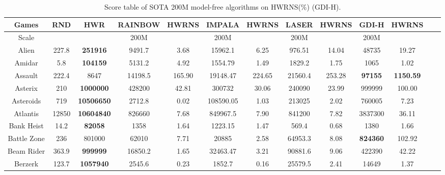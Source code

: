 \documentclass[nohyperref]{article}
\theoremstyle{plain}
\begin{document}
\begin{table}[!hb]
\footnotesize
\begin{center}
\caption{Score table of SOTA 200M model-free algorithms on HWRNS(\%)  (GDI-H). }
\setlength{\tabcolsep}{1.0pt}
\begin{tabular}{|c| c| c| c c| c c| c c| c c| c c|}
\hline
Games               & RND       & HWR       & RAINBOW  & HWRNS & IMPALA  & HWRNS & LASER  & HWRNS  & GDI-H & HWRNS \\
\hline
Scale               &           &           & 200M     &           &  200M   &            & 200M    &                      &    200M   &\\
\hline
 Alien              & 227.8     & \textbf{251916}    & 9491.7   &3.68    & 15962.1    & 6.25       & 976.51  & 14.04      &48735             &19.27   \\
 Amidar             & 5.8       & \textbf{104159}    & 5131.2   &4.92    & 1554.79    & 1.49       & 1829.2  & 1.75        &1065              &1.02          \\
 Assault            & 222.4     & 8647             & 14198.5  &165.90  & 19148.47   & 224.65     & 21560.4 & 253.28      &\textbf{97155}             &\textbf{1150.59} \\
 Asterix            & 210       & \textbf{1000000}   & 428200   &42.81   & 300732     & 30.06      & 240090  & 23.99     &999999            &100.00 \\
 Asteroids          & 719       & \textbf{10506650}  & 2712.8   &0.02    & 108590.05  & 1.03       & 213025  & 2.02        &760005            &7.23\\
 Atlantis           & 12850     & \textbf{10604840}  & 826660   &7.68    & 849967.5   & 7.90       & 841200  & 7.82      &3837300           &36.11\\
 Bank Heist         & 14.2      & \textbf{82058}     & 1358     &1.64    & 1223.15    & 1.47       & 569.4   & 0.68       &1380              &1.66  \\
 Battle Zone        & 236       & 801000    & 62010    &7.71    & 20885      & 2.58       & 64953.3 & 8.08       &\textbf{824360}            &102.92 \\
 Beam Rider         & 363.9     & \textbf{999999}    & 16850.2  &1.65    & 32463.47   & 3.21       & 90881.6 & 9.06        &422390            &42.22   \\
 Berzerk            & 123.7     & \textbf{1057940}   & 2545.6   &0.23    & 1852.7     & 0.16       & 25579.5 & 2.41        &14649             &1.37          \\

\end{tabular}
\end{center}
\end{table}
\end{document}
